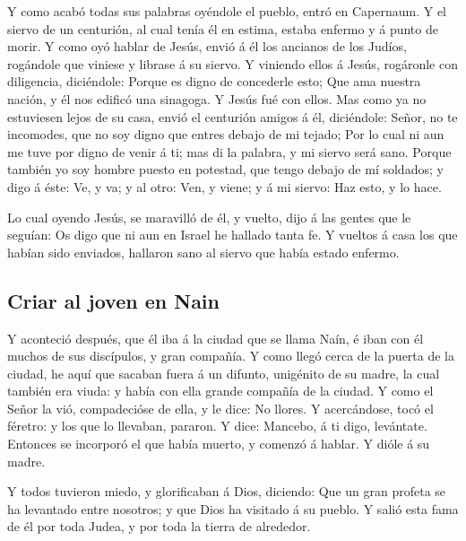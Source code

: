  Y como acabó todas sus palabras oyéndole el pueblo, entró
en Capernaum.  Y el siervo de un centurión, al cual tenía
él en estima, estaba enfermo y á punto de morir.  Y como
oyó hablar de Jesús, envió á él los ancianos de los Judíos, rogándole
que viniese y librase á su siervo.  Y viniendo ellos á
Jesús, rogáronle con diligencia, diciéndole: Porque es digno de
concederle esto;  Que ama nuestra nación, y él nos edificó
una sinagoga.  Y Jesús fué con ellos. Mas como ya no
estuviesen lejos de su casa, envió el centurión amigos á él, diciéndole:
Señor, no te incomodes, que no soy digno que entres debajo de mi tejado;
 Por lo cual ni aun me tuve por digno de venir á ti; mas
di la palabra, y mi siervo será sano.  Porque también yo
soy hombre puesto en potestad, que tengo debajo de mí soldados; y digo á
éste: Ve, y va; y al otro: Ven, y viene; y á mi siervo: Haz esto, y lo
hace.

 Lo cual oyendo Jesús, se maravilló de él, y vuelto, dijo
á las gentes que le seguían: Os digo que ni aun en Israel he hallado
tanta fe.  Y vueltos á casa los que habían sido enviados,
hallaron sano al siervo que había estado enfermo.

\hypertarget{criar-al-joven-en-nain}{%
\subsection{Criar al joven en Nain}\label{criar-al-joven-en-nain}}

 Y aconteció después, que él iba á la ciudad que se llama
Naín, é iban con él muchos de sus discípulos, y gran compañía.
 Y como llegó cerca de la puerta de la ciudad, he aquí
que sacaban fuera á un difunto, unigénito de su madre, la cual también
era viuda: y había con ella grande compañía de la ciudad.
 Y como el Señor la vió, compadecióse de ella, y le dice:
No llores.  Y acercándose, tocó el féretro: y los que lo
llevaban, pararon. Y dice: Mancebo, á ti digo, levántate.
 Entonces se incorporó el que había muerto, y comenzó á
hablar. Y dióle á su madre.

 Y todos tuvieron miedo, y glorificaban á Dios, diciendo:
Que un gran profeta se ha levantado entre nosotros; y que Dios ha
visitado á su pueblo.  Y salió esta fama de él por toda
Judea, y por toda la tierra de alrededor.

